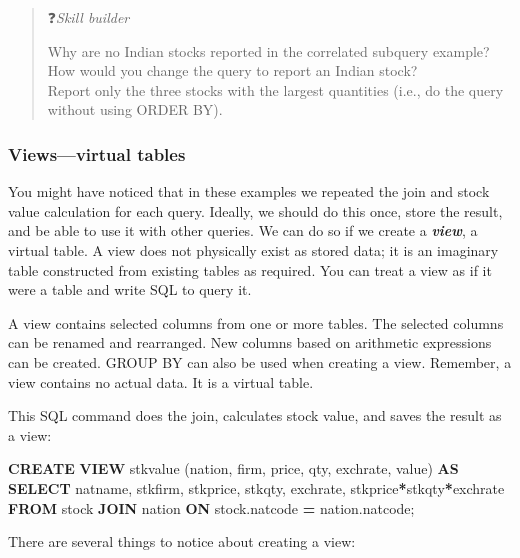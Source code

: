\documentclass[
]{article}
\newenvironment{Shaded}{\begin{snugshade}}{\end{snugshade}}
\newcommand{\FunctionTok}[1]{\textcolor[rgb]{0.00,0.00,0.00}{#1}}
\newcommand{\KeywordTok}[1]{\textcolor[rgb]{0.13,0.29,0.53}{\textbf{#1}}}
\newcommand{\NormalTok}[1]{#1}
\newcommand{\OperatorTok}[1]{\textcolor[rgb]{0.81,0.36,0.00}{\textbf{#1}}}
\begin{document}
\begin{quote}
❓\emph{Skill builder}

Why are no Indian stocks reported in the correlated subquery example?
How would you change the query to report an Indian stock?\\
Report only the three stocks with the largest quantities (i.e., do the
query without using ORDER BY).
\end{quote}

\hypertarget{viewsvirtual-tables}{%
\subsubsection*{Views---virtual tables}\label{viewsvirtual-tables}}

You might have noticed that in these examples we repeated the join and
stock value calculation for each query. Ideally, we should do this once,
store the result, and be able to use it with other queries. We can do so
if we create a \textbf{\emph{view}}, a virtual table. A view does not physically
exist as stored data; it is an imaginary table constructed from existing
tables as required. You can treat a view as if it were a table and write
SQL to query it.

A view contains selected columns from one or more tables. The selected
columns can be renamed and rearranged. New columns based on arithmetic
expressions can be created. GROUP BY can also be used when creating a
view. Remember, a view contains no actual data. It is a virtual table.

This SQL command does the join, calculates stock value, and saves the
result as a view:

\begin{Shaded}
\begin{Highlighting}[]
\KeywordTok{CREATE} \KeywordTok{VIEW}\NormalTok{ stkvalue}
\NormalTok{    (nation, firm, price, qty, exchrate, }\FunctionTok{value}\NormalTok{)}
    \KeywordTok{AS} \KeywordTok{SELECT}\NormalTok{ natname, stkfirm, stkprice, stkqty, exchrate,}
\NormalTok{        stkprice}\OperatorTok{*}\NormalTok{stkqty}\OperatorTok{*}\NormalTok{exchrate}
            \KeywordTok{FROM}\NormalTok{ stock }\KeywordTok{JOIN}\NormalTok{ nation}
            \KeywordTok{ON}\NormalTok{ stock.natcode }\OperatorTok{=}\NormalTok{ nation.natcode;}
\end{Highlighting}
\end{Shaded}

There are several things to notice about creating a view:
\end{document}
